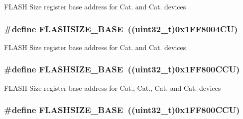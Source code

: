 F\-L\-A\-S\-H Size register base address for Cat. and Cat. devices \hypertarget{group___peripheral__memory__map_ga776d985f2d4d40b588ef6ca9d573af78}{
\subsubsection[{F\-L\-A\-S\-H\-S\-I\-Z\-E\-\_\-\-B\-A\-S\-E}]{\setlength{\rightskip}{0pt plus 5cm}\#define F\-L\-A\-S\-H\-S\-I\-Z\-E\-\_\-\-B\-A\-S\-E~((uint32\-\_\-t)0x1\-F\-F8004\-C\-U)}}\label{group___peripheral__memory__map_ga776d985f2d4d40b588ef6ca9d573af78}
F\-L\-A\-S\-H Size register base address for Cat. and Cat. devices \hypertarget{group___peripheral__memory__map_ga776d985f2d4d40b588ef6ca9d573af78}{
\subsubsection[{F\-L\-A\-S\-H\-S\-I\-Z\-E\-\_\-\-B\-A\-S\-E}]{\setlength{\rightskip}{0pt plus 5cm}\#define F\-L\-A\-S\-H\-S\-I\-Z\-E\-\_\-\-B\-A\-S\-E~((uint32\-\_\-t)0x1\-F\-F800\-C\-C\-U)}}\label{group___peripheral__memory__map_ga776d985f2d4d40b588ef6ca9d573af78}
F\-L\-A\-S\-H Size register base address for Cat., Cat., Cat. and Cat. devices \hypertarget{group___peripheral__memory__map_ga776d985f2d4d40b588ef6ca9d573af78}{
\subsubsection[{F\-L\-A\-S\-H\-S\-I\-Z\-E\-\_\-\-B\-A\-S\-E}]{\setlength{\rightskip}{0pt plus 5cm}\#define F\-L\-A\-S\-H\-S\-I\-Z\-E\-\_\-\-B\-A\-S\-E~((uint32\-\_\-t)0x1\-F\-F800\-C\-C\-U)}}\label{group___peripheral__memory__map_ga776d985f2d4d40b588ef6ca9d573af78}
